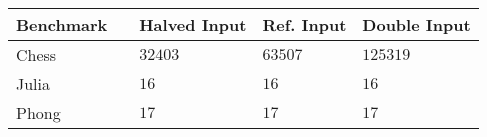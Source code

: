 
\begin{tabular}{lllll}
	Benchmark	& \phantom{Input Data}			& Halved Input	& Ref. Input	& Double Input	\\ \hline
	Chess		& \phantom{No. Tiles}			& $32403$		& $63507$		& $125319$		\\
	Julia		& \phantom{No. Iterations}		& $16$			& $16$			& $16$			\\
	Phong		& \phantom{Texture Resolution}	& $17$ 		& $17$ 				& $17$			\\
\end{tabular} %

